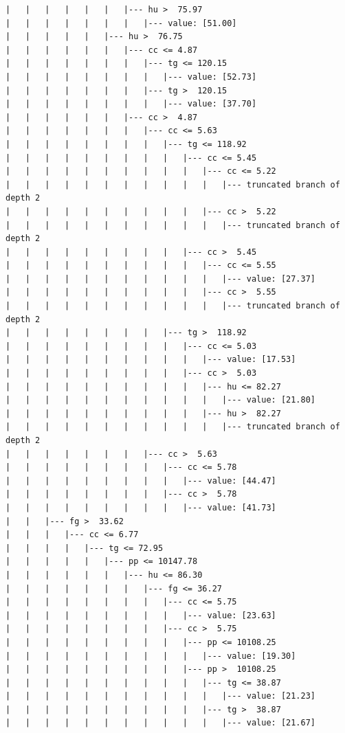 \documentclass[UTF8, a4paper]{ctexart}
\begin{document}
\begin{lstlisting}
|   |   |   |   |   |   |--- hu >  75.97
|   |   |   |   |   |   |   |--- value: [51.00]
|   |   |   |   |   |--- hu >  76.75
|   |   |   |   |   |   |--- cc <= 4.87
|   |   |   |   |   |   |   |--- tg <= 120.15
|   |   |   |   |   |   |   |   |--- value: [52.73]
|   |   |   |   |   |   |   |--- tg >  120.15
|   |   |   |   |   |   |   |   |--- value: [37.70]
|   |   |   |   |   |   |--- cc >  4.87
|   |   |   |   |   |   |   |--- cc <= 5.63
|   |   |   |   |   |   |   |   |--- tg <= 118.92
|   |   |   |   |   |   |   |   |   |--- cc <= 5.45
|   |   |   |   |   |   |   |   |   |   |--- cc <= 5.22
|   |   |   |   |   |   |   |   |   |   |   |--- truncated branch of depth 2
|   |   |   |   |   |   |   |   |   |   |--- cc >  5.22
|   |   |   |   |   |   |   |   |   |   |   |--- truncated branch of depth 2
|   |   |   |   |   |   |   |   |   |--- cc >  5.45
|   |   |   |   |   |   |   |   |   |   |--- cc <= 5.55
|   |   |   |   |   |   |   |   |   |   |   |--- value: [27.37]
|   |   |   |   |   |   |   |   |   |   |--- cc >  5.55
|   |   |   |   |   |   |   |   |   |   |   |--- truncated branch of depth 2
|   |   |   |   |   |   |   |   |--- tg >  118.92
|   |   |   |   |   |   |   |   |   |--- cc <= 5.03
|   |   |   |   |   |   |   |   |   |   |--- value: [17.53]
|   |   |   |   |   |   |   |   |   |--- cc >  5.03
|   |   |   |   |   |   |   |   |   |   |--- hu <= 82.27
|   |   |   |   |   |   |   |   |   |   |   |--- value: [21.80]
|   |   |   |   |   |   |   |   |   |   |--- hu >  82.27
|   |   |   |   |   |   |   |   |   |   |   |--- truncated branch of depth 2
|   |   |   |   |   |   |   |--- cc >  5.63
|   |   |   |   |   |   |   |   |--- cc <= 5.78
|   |   |   |   |   |   |   |   |   |--- value: [44.47]
|   |   |   |   |   |   |   |   |--- cc >  5.78
|   |   |   |   |   |   |   |   |   |--- value: [41.73]
|   |   |--- fg >  33.62
|   |   |   |--- cc <= 6.77
|   |   |   |   |--- tg <= 72.95
|   |   |   |   |   |--- pp <= 10147.78
|   |   |   |   |   |   |--- hu <= 86.30
|   |   |   |   |   |   |   |--- fg <= 36.27
|   |   |   |   |   |   |   |   |--- cc <= 5.75
|   |   |   |   |   |   |   |   |   |--- value: [23.63]
|   |   |   |   |   |   |   |   |--- cc >  5.75
|   |   |   |   |   |   |   |   |   |--- pp <= 10108.25
|   |   |   |   |   |   |   |   |   |   |--- value: [19.30]
|   |   |   |   |   |   |   |   |   |--- pp >  10108.25
|   |   |   |   |   |   |   |   |   |   |--- tg <= 38.87
|   |   |   |   |   |   |   |   |   |   |   |--- value: [21.23]
|   |   |   |   |   |   |   |   |   |   |--- tg >  38.87
|   |   |   |   |   |   |   |   |   |   |   |--- value: [21.67]

\end{lstlisting}
\end{document}
